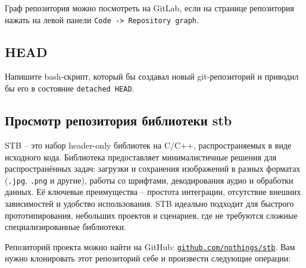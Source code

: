 \documentclass{article}
\begin{document}
Граф репозитория можно посмотреть на GitLab, если на странице репозитория нажать на левой панели \texttt{Code -> Repository graph}.

\subsection{HEAD}
Напишите bash-скрипт, который бы создавал новый git-репозиторий и приводил бы его в состояние \texttt{detached HEAD}.

\subsection{Просмотр репозитория библиотеки stb}
STB -- это набор header-only библиотек на C/C++, распространяемых в виде исходного кода. Библиотека предоставляет минималистичные решения для распространённых задач: загрузки и сохранения изображений в разных форматах (\texttt{.jpg}, \texttt{.png} и другие), работы со шрифтами, декодирования аудио и обработки данных. Её ключевые преимущества -- простота интеграции, отсутствие внешних зависимостей и удобство использования. STB идеально подходит для быстрого прототипирования, небольших проектов и сценариев, где не требуются сложные специализированные библиотеки.

Репозиторий проекта можно найти на GitHub: \href{https://github.com/nothings/stb}{\texttt{github.com/nothings/stb}}. Вам нужно клонировать этот репозиторий себе и произвести следующие операции:
\end{document}
